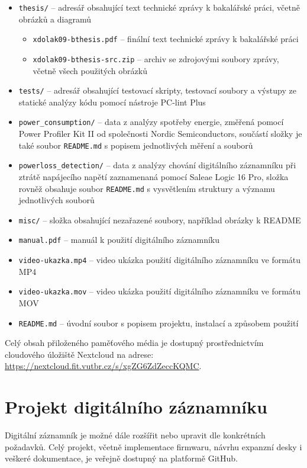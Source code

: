 \begin{itemize}
    
    \item \texttt{thesis/} -- adresář obsahující text technické zprávy k bakalářské práci, včetně obrázků a diagramů

    \begin{itemize}
        \item \texttt{xdolak09-bthesis.pdf} -- finální text technické zprávy k bakalářské práci
        \item \texttt{xdolak09-bthesis-src.zip} -- archiv se zdrojovými soubory zprávy, včetně všech použitých obrázků
    \end{itemize}

    \item \texttt{tests/} -- adresář obsahující testovací skripty, testovací soubory a výstupy ze statické analýzy kódu pomocí nástroje PC-lint Plus
    
    \item \texttt{power\_consumption/} -- data z analýzy spotřeby energie, změřená pomocí Power Profiler Kit II od společnosti Nordic Semiconductors, součástí složky je také soubor \texttt{README.md} s popisem jednotlivých měření a souborů

    \item \texttt{powerloss\_detection/} -- data z analýzy chování digitálního záznamníku při ztrátě napájecího napětí zaznamenaná pomocí Saleae Logic 16 Pro, složka rovněž obsahuje soubor \texttt{README.md} s vysvětlením struktury a významu jednotlivých souborů
    
    \item \texttt{misc/} -- složka obsahující nezařazené soubory, například obrázky k README

    \item \texttt{manual.pdf} -- manuál k použití digitálního záznamníku
    \item \texttt{video-ukazka.mp4} -- video ukázka použití digitálního záznamníku ve formátu MP4
    \item \texttt{video-ukazka.mov} -- video ukázka použití digitálního záznamníku ve formátu MOV
    \item \texttt{README.md} -- úvodní soubor s popisem projektu, instalací a způsobem použití
\end{itemize}

Celý obsah přiloženého paměťového média je dostupný prostřednictvím cloudového úložiště Nextcloud na adrese: \url{https://nextcloud.fit.vutbr.cz/s/xgZG6ZdZeccKQMC}.


\chapter{Projekt digitálního záznamníku}
Digitální záznamník je možné dále rozšířit nebo upravit dle konkrétních požadavků. Celý projekt, včetně implementace firmwaru, návrhu expanzní desky i veškeré dokumentace, je veřejně dostupný na platformě GitHub.

